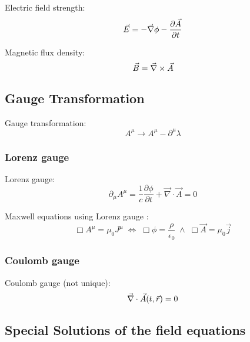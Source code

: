 		\noindent
		Electric field strength:
		\begin{equation}
			\vec{E} = -\vec{\nabla}\phi-\frac{\partial \vec{A}}{\partial t}
		\end{equation}

		\noindent
		Magnetic flux density:
		\begin{equation}
			\vec{B} = \vec{\nabla}\times\vec{A}
		\end{equation}

	\subsection{Gauge Transformation}
		\noindent
		Gauge transformation:
		\begin{equation}
			A^\mu \rightarrow A^\mu-\partial^\mu \lambda
		\end{equation}

		\subsubsection{Lorenz gauge}
			\noindent
			Lorenz gauge:
			\begin{equation}
				\partial_\mu A^\mu = \frac{1}{c}\frac{\partial \phi}{\partial t} + \vec{\nabla}\cdot\vec{A} = 0
			\end{equation}

			\noindent
			Maxwell equations using Lorenz gauge :
			\begin{equation}
				\Box A^\mu = \mu_0 J^\mu \;\Leftrightarrow\;
				\Box \phi = \dfrac{\rho}{\epsilon_0} \;\wedge\;
				\Box \vec{A} = \mu_0 \vec{j}
			\end{equation}

		\subsubsection{Coulomb gauge }
			\noindent
			Coulomb gauge (not unique):
			\begin{equation}
				\vec{\nabla}\cdot\vec{A}(t,\vec{r})=0
			\end{equation}

	\subsection{Special Solutions of the field equations}
